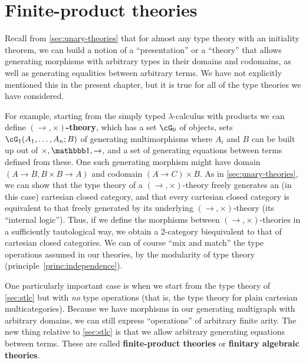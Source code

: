 \section{Finite-product theories}
\label{sec:fp-theories}

Recall from \cref{sec:unary-theories} that for almost any type theory with an initiality theorem, we can build a notion of a ``presentation'' or a ``theory'' that allows generating morphisms with arbitrary types in their domains and codomains, as well as generating equalities between arbitrary terms.
We have not explicitly mentioned this in the present chapter, but it is true for all of the type theories we have considered.

For example, starting from the simply typed $\lambda$-calculus with products we can define \textbf{$(\to,\times)$-theory}, which has a set $\cG_0$ of objects, sets $\cG_1(A_1,\dots,A_n;B)$ of generating multimorphisms where $A_i$ and $B$ can be built up out of $\times,\unit,\to$, and a set of generating equations between terms defined from these.
One such generating morphism might have domain $(A\to B, B\times B\to A)$ and codomain $(A\to C)\times B$.
As in \cref{sec:unary-theories}, we can show that the type theory of a $(\to,\times)$-theory freely generates an (in this case) cartesian closed category, and that every cartesian closed category is equivalent to that freely generated by its underlying $(\to,\times)$-theory (its ``internal logic'').
Thus, if we define the morphisms between $(\to,\times)$-theories in a sufficiently tautological way, we obtain a 2-category biequivalent to that of cartesian closed categories.
We can of course ``mix and match'' the type operations assumed in our theories, by the modularity of type theory (principle~\eqref{princ:independence}).

One particularly important case is when we start from the type theory of \cref{sec:stlc} but with \emph{no} type operations (that is, the type theory for plain cartesian multicategories).
Because we have morphisms in our generating multigraph with arbitrary domains, we can still express ``operations'' of arbitrary finite arity.
The new thing relative to \cref{sec:stlc} is that we allow arbitrary generating equations between terms.
These are called \textbf{finite-product theories} or \textbf{finitary algebraic theories}.

